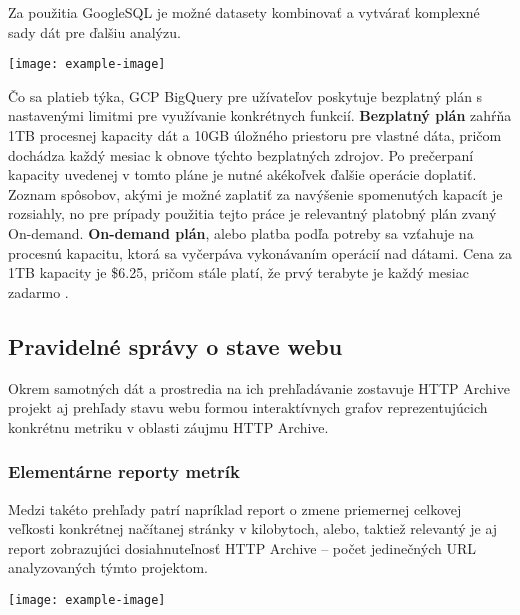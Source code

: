 \pagebreak

Za použitia GoogleSQL je možné datasety kombinovať a vytvárať komplexné sady dát pre ďalšiu analýzu.

\begin{center}
\noindent\texttt{[image: example-image]}    
\end{center}

Čo sa platieb týka, GCP BigQuery pre užívateľov poskytuje bezplatný plán s nastavenými limitmi pre využívanie konkrétnych funkcií.
\textbf{Bezplatný plán} zahŕňa 1TB procesnej kapacity dát a 10GB úložného priestoru pre vlastné dáta, pričom dochádza každý mesiac k obnove týchto bezplatných zdrojov.
Po prečerpaní kapacity uvedenej v tomto pláne je nutné akékoľvek ďalšie operácie doplatiť.
Zoznam spôsobov, akými je možné zaplatiť za navýšenie spomenutých kapacít je rozsiahly, no pre prípady použitia tejto práce je relevantný platobný plán zvaný On-demand.
\textbf{On-demand plán}, alebo platba podľa potreby sa vzťahuje na procesnú kapacitu, ktorá sa vyčerpáva vykonávaním operácií nad dátami.
Cena za 1TB kapacity je \$6.25, pričom stále platí, že prvý terabyte je každý mesiac zadarmo \cite{google-bq-pricing}.

\subsection{Pravidelné správy o stave webu}

Okrem samotných dát a prostredia na ich prehľadávanie zostavuje HTTP Archive projekt aj prehľady stavu webu formou interaktívnych grafov reprezentujúcich konkrétnu metriku v oblasti záujmu HTTP Archive.

\subsubsection{Elementárne reporty metrík}
Medzi takéto prehľady patrí napríklad report o zmene priemernej celkovej veľkosti konkrétnej načítanej stránky v kilobytoch, alebo, taktiež relevantý je aj report zobrazujúci dosiahnuteľnosť HTTP Archive -- počet jedinečných URL analyzovaných týmto projektom.

\begin{center}
\noindent\texttt{[image: example-image]}    
\end{center}

